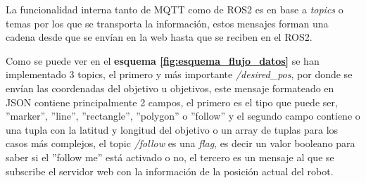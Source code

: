 La funcionalidad interna tanto de MQTT como de ROS2 es en base a \textit{topics} o temas por los que se transporta la información, estos 
mensajes forman una cadena desde que se envían en la web hasta que se reciben en el ROS2.

Como se puede ver en el \textbf{esquema \ref{fig:esquema_flujo_datos}} se han implementado 3 topics, el primero y más importante 
\textit{/desired\_pos}, por donde se envían las coordenadas del objetivo u objetivos, este mensaje formateado en JSON contiene principalmente 2 
campos, el primero es el tipo que puede ser, ''marker'', ''line'', ''rectangle'', ''polygon'' o ''follow'' y el segundo campo contiene o 
una tupla con la latitud y longitud del objetivo o un array de tuplas para los casos más complejos, el topic \textit{/follow} es una \textit{flag}, 
es decir un valor booleano para saber si el ''follow me'' está activado o no, el tercero es un mensaje al que se subscribe el servidor web con 
la información de la posición actual del robot.


